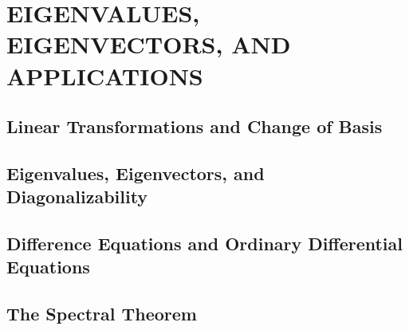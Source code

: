 \section{EIGENVALUES, EIGENVECTORS, AND APPLICATIONS}
\subsection{Linear Transformations and Change of Basis}
\subsection{Eigenvalues, Eigenvectors, and Diagonalizability}
\subsection{Difference Equations and Ordinary Differential Equations}
\subsection{The Spectral Theorem}